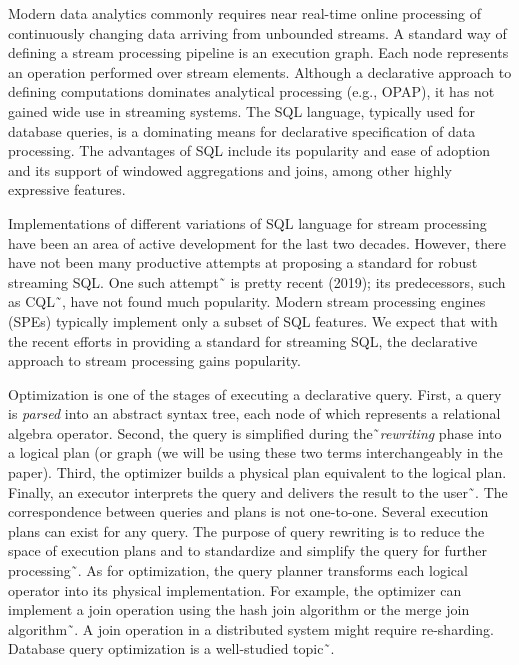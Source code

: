 \label {fs-optimization-introduction}

Modern data analytics commonly requires near real-time online processing of continuously changing data arriving from unbounded streams. 
A standard way of defining a stream processing pipeline is an execution graph. Each node represents an operation performed over stream elements. 
Although a declarative approach to defining computations dominates analytical processing (e.g., OPAP),  it has not gained wide use in streaming systems. 
The SQL language, typically used for database queries, is a dominating means for declarative specification of data processing. 
The advantages of SQL include its popularity and ease of adoption and its support of windowed aggregations and joins, among other highly expressive features. 

Implementations of different variations of SQL language for stream processing have been an area of active development for the last two decades. 
However, there have not been many productive attempts at proposing a standard for robust streaming SQL. 
One such attempt˜\cite{Begoli:2019:OSR:3299869.3314040} is pretty recent (2019); its predecessors, such as CQL˜\cite{Arasu:2006:CCQ:1146461.1146463}, have not found much popularity.
 Modern stream processing engines (SPEs) typically implement only a subset of SQL features. 
 We expect that with the recent efforts in providing a standard for streaming SQL, the declarative approach to stream processing gains popularity. 

Optimization is one of the stages of executing a declarative query. 
First, a query is \textit{parsed} into an abstract syntax tree, each node of which represents a relational algebra operator. 
Second, the query is simplified during the˜\textit{rewriting} phase into a logical plan (or graph (we will be using these two terms interchangeably in the paper).
 Third, the optimizer builds a physical plan equivalent to the logical plan. Finally, an executor interprets the query and delivers the result to the user˜\cite{Pitoura2018processing}. 
The correspondence between queries and plans is not one-to-one. Several execution plans can exist for any query.
The purpose of query rewriting is to reduce the space of execution plans and to standardize and simplify the query for further processing˜\cite{Pitoura2018rewriting}.
 As for optimization, the query planner transforms each logical operator into its physical implementation. For example, the optimizer can implement a join operation using the hash join algorithm or the merge join algorithm˜\cite{Neumann2018optimization}. A join operation in a distributed system might require re-sharding.  
Database query optimization is a well-studied topic˜\cite{astrahan1976system, haas1989extensible, graefe1993volcano}. 


